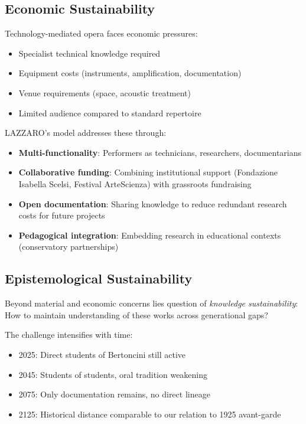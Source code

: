 \subsection{Economic Sustainability}

Technology-mediated opera faces economic pressures:
\begin{itemize}
  \item Specialist technical knowledge required
  \item Equipment costs (instruments, amplification, documentation)
  \item Venue requirements (space, acoustic treatment)
  \item Limited audience compared to standard repertoire
\end{itemize}

LAZZARO's model addresses these through:
\begin{itemize}
  \item \textbf{Multi-functionality}: Performers as technicians, researchers, 
  documentarians
  \item \textbf{Collaborative funding}: Combining institutional support 
  (Fondazione Isabella Scelsi, Festival ArteScienza) with grassroots fundraising
  \item \textbf{Open documentation}: Sharing knowledge to reduce redundant 
  research costs for future projects
  \item \textbf{Pedagogical integration}: Embedding research in educational 
  contexts (conservatory partnerships)
\end{itemize}

\subsection{Epistemological Sustainability}

Beyond material and economic concerns lies question of \emph{knowledge 
sustainability}: How to maintain understanding of these works across 
generational gaps?

The challenge intensifies with time:
\begin{itemize}
  \item 2025: Direct students of Bertoncini still active
  \item 2045: Students of students, oral tradition weakening
  \item 2075: Only documentation remains, no direct lineage
  \item 2125: Historical distance comparable to our relation to 1925 avant-garde
\end{itemize}

